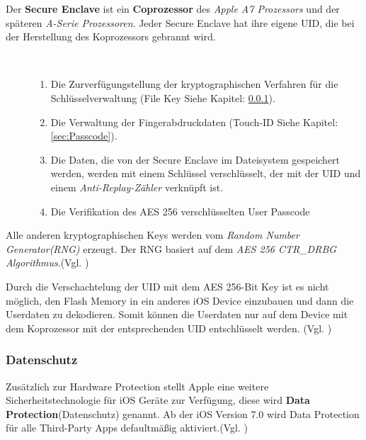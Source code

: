Der \textbf{Secure Enclave} ist ein \textbf{Coprozessor} des \textit{\glqq Apple A7 Prozessors\grqq{}} und der späteren \textit{\glqq A-Serie Prozessoren\grqq}. Jeder Secure Enclave hat ihre eigene UID, die bei der Herstellung des Koprozessors gebrannt wird.

\newpage
\begin{description}
     \item[\parbox{\textwidth} {Die Secure Enclave hat folgende Aufgaben}]~\par
    \begin{enumerate}
        \item Die Zurverfügungstellung der kryptographischen Verfahren für die Schlüsselverwaltung (File Key Siehe Kapitel: \ref{sec:DataProtection}).
       \item Die Verwaltung der Fingerabdruckdaten (Touch-ID Siehe Kapitel: \ref{sec:Passcode}).
       \item Die Daten, die von der Secure Enclave im Dateisystem gespeichert werden, werden mit einem Schlüssel verschlüsselt, der mit der UID und einem \textit{\glqq Anti-Replay-Zähler\grqq{}} verknüpft ist.
       \item Die Verifikation des AES 256 verschlüsselten User Passcode
    \end{enumerate}   
\end{description} 

Alle anderen kryptographischen Keys werden vom \textit{\glqq Random Number Generator(RNG)\grqq{}} erzeugt. Der RNG basiert auf dem \textit{\glqq AES 256 CTR\_DRBG Algorithmus\grqq{}}.(Vgl. \cite{iOSSec[5], iOSSec[2],iOSSec[1], Apple[4], Apple[5], Apple[6], Apple[3]})

Durch die Verschachtelung der UID mit dem AES 256-Bit Key ist es nicht möglich, den Flash Memory in ein anderes iOS Device einzubauen und dann die Userdaten zu dekodieren. Somit können die Userdaten nur auf dem Device mit dem Koprozessor mit der entsprechenden UID entschlüsselt werden. (Vgl. \cite{iOSSec[5], iOSSec[2],iOSSec[1], Apple[4], Apple[5], Apple[6], Apple[3]})

\subsubsection{Datenschutz}
\label{sec:DataProtection}

Zusätzlich zur Hardware Protection stellt Apple eine weitere Sicherheitstechnologie für iOS Geräte zur Verfügung, diese wird \textbf{Data Protection}(Datenschutz) genannt. Ab der iOS Version 7.0 wird Data Protection für alle Third-Party Apps defaultmäßig aktiviert.(Vgl. \cite{iOSSec[5], iOSSec[2],iOSSec[1], Apple[4], Apple[5], Apple[6], Apple[3]})


